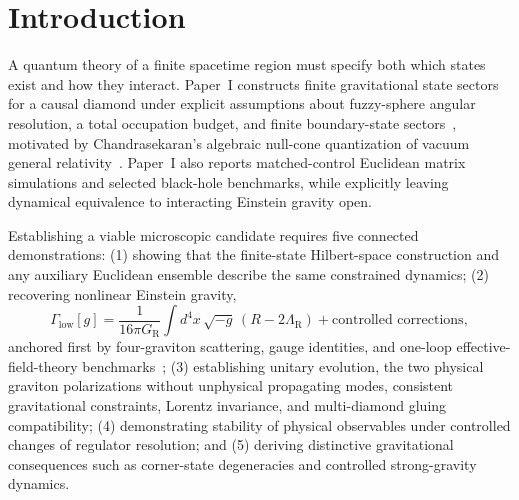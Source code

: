 \documentclass[11pt]{article}
\begin{document}
\begin{abstract}
Fock sector and on spin-2 Gel'fand--Naimark boost generators reveals that total-budget coupling leaks $O(1)$ Lorentz-algebra defects onto the lowest $j_1=2$ graviton mode whenever spectator excitations approach the budget ceiling. One-loop finite-$N$ amplitudes, dynamical corner microstates, and Euclidean--Lorentzian reconstruction remain open.
\end{abstract}

\section{Introduction}\label{sec:intro}

A quantum theory of a finite spacetime region must specify both which states exist and how they interact. Paper~I constructs finite gravitational state sectors for a causal diamond under explicit assumptions about fuzzy-sphere angular resolution, a total occupation budget, and finite boundary-state sectors~\cite{PaperI}, motivated by Chandrasekaran's algebraic null-cone quantization of vacuum general relativity~\cite{Chandrasekaran2026}. Paper~I also reports matched-control Euclidean matrix simulations and selected black-hole benchmarks, while explicitly leaving dynamical equivalence to interacting Einstein gravity open.

Establishing a viable microscopic candidate requires five connected demonstrations: (1) showing that the finite-state Hilbert-space construction and any auxiliary Euclidean ensemble describe the same constrained dynamics; (2) recovering nonlinear Einstein gravity,
\begin{equation}\label{eq:eft_target}
\Gamma_{\mathrm{low}}[g]
= \frac{1}{16\pi G_{\mathrm{R}}} \int d^4x\,\sqrt{-g}\,(R - 2\Lambda_{\mathrm{R}})
+ \text{controlled corrections},
\end{equation}
anchored first by four-graviton scattering, gauge identities, and one-loop effective-field-theory benchmarks~\cite{Donoghue1994,DunbarNorridge1995,Weinberg1964}; (3) establishing unitary evolution, the two physical graviton polarizations without unphysical propagating modes, consistent gravitational constraints, Lorentz invariance, and multi-diamond gluing compatibility; (4) demonstrating stability of physical observables under controlled changes of regulator resolution; and (5) deriving distinctive gravitational consequences such as corner-state degeneracies and controlled strong-gravity dynamics.
\end{document}
